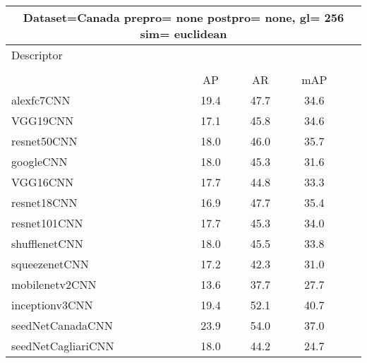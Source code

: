 \documentclass[12pt,italian]{article}
\begin{document}
\small
\begin{longtable}{lcccc}
\toprule
\multicolumn{16}{c}{Dataset=Canada prepro= none postpro= none, gl= 256 sim= euclidean} \\ 
\toprule
Descriptor \\ 
\\ 
& AP & AR & mAP \\ 
\midrule
alexfc7CNN & 19.4 & 47.7 & 34.6 \\ 
VGG19CNN & 17.1 & 45.8 & 34.6 \\ 
resnet50CNN & 18.0 & 46.0 & 35.7 \\ 
googleCNN & 18.0 & 45.3 & 31.6 \\ 
VGG16CNN & 17.7 & 44.8 & 33.3 \\ 
resnet18CNN & 16.9 & 47.7 & 35.4 \\ 
resnet101CNN & 17.7 & 45.3 & 34.0 \\ 
shufflenetCNN & 18.0 & 45.5 & 33.8 \\ 
squeezenetCNN & 17.2 & 42.3 & 31.0 \\ 
mobilenetv2CNN & 13.6 & 37.7 & 27.7 \\ 
inceptionv3CNN & 19.4 & 52.1 & 40.7 \\ 
seedNetCanadaCNN & 23.9 & 54.0 & 37.0 \\ 
seedNetCagliariCNN & 18.0 & 44.2 & 24.7 \\ 
\bottomrule
\end{longtable} 
\end{document}

